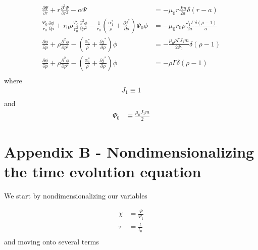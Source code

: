 \documentclass{article}
\begin{document}
\begin{equation} \label{wessonCurrentProfile}
\begin{split}
 \frac{\partial \Psi}{\partial r} +r   \frac{\partial^2 \Psi}{\partial r^2} - \alpha \Psi & = - \mu_0r  \frac{Jm}{2a} \delta (r-a)\\ 
 \frac{\Psi_0}{r_0} \frac{\partial \phi}{\partial \rho} + r_0 \rho \frac{\Psi_0}{r_0^2}   \frac{\partial^2 \phi}{\partial \rho^2} - \frac{1}{r_0}\left( \frac{\alpha^*_1}{ \rho} +\frac{\partial j^*}{\partial \rho} \right) \Psi_0 \phi & = - \mu_0 r_0 \rho \frac{J_1 \Gamma}{2a} \frac{\delta (\rho - 1)}{a}\\
\frac{\partial \phi}{\partial \rho} + \rho   \frac{\partial^2 \phi}{\partial \rho^2} - \left( \frac{\alpha^*_1}{ \rho} +\frac{\partial j^*}{\partial \rho} \right) \phi & = - \frac{\mu_0 \rho \Gamma J_1 m}{2 \Psi_0} \delta (\rho - 1)\\
\frac{\partial \phi}{\partial \rho} + \rho   \frac{\partial^2 \phi}{\partial \rho^2} - \left( \frac{\alpha^*_1}{ \rho} +\frac{\partial j^*}{\partial \rho} \right)\phi & = - \rho \Gamma \delta (\rho - 1)\\
\end{split} 
\end{equation} 
where
\begin{equation} \label{wessonCurrentProfile}
\begin{split}
J_1 \equiv 1 \\
\end{split} 
\end{equation} 
and
\begin{equation} \label{wessonCurrentProfile}
\begin{split}
\Psi_0 & \equiv  \frac{\mu_0 J_1 m}{2}
\end{split} 
\end{equation} 


\section*{Appendix B - Nondimensionalizing the time evolution equation}

We start by nondimensionalizing our variables

\begin{equation} \label{wessonCurrentProfile}
\begin{split}
\chi & = \frac{\Psi}{\Psi_1}\\
\tau & = \frac{t}{t_0}\\
\end{split} 
\end{equation} 
and moving onto several terms
\end{document}

